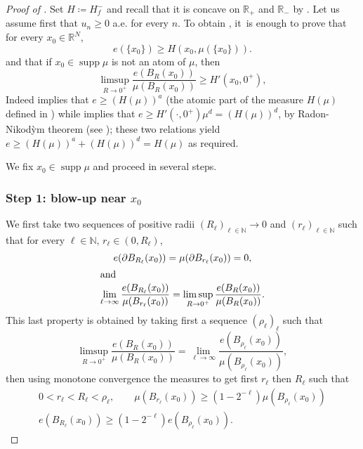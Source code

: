 \documentclass[10pt]{amsart}
\theoremstyle{plain}
\theoremstyle{definition}
\newcommand{\N}{\mathbb{N}}
\newcommand{\R}{\mathbb{R}}
\DeclareMathOperator{\supp}{supp}
\begin{document}
\begin{proof}[Proof of ]
Set $H \coloneqq H_f^-$ and recall that it is concave on $\R_+$ and $\R_-$ by . Let us assume first that $u_n \geq 0$ a.e. for every $n$. To obtain , it~is enough to prove that for every \(x_0\in\R^N\),
\begin{equation}\label{atomic}
e(\{x_0\})\ge H(x_0,\mu(\{x_0\})).
\end{equation}
and that if \(x_0 \in \supp \mu\) is not an atom of $\mu$, then
\begin{equation}\label{diffuse}
\limsup_{R\to 0^+}\frac{e(B_R(x_0))}{\mu(B_R(x_0))}\ge H'(x_0,0^+),
\end{equation}
Indeed  implies that $e \geq (H(\mu))^a$ (the atomic part of the measure \(H(\mu)\) defined in ) while  implies that $e \geq H'(\cdot,0^+) \mu^d = (H(\mu))^d$, by Radon-Nikod\`ym theorem (see \cite[Th.\,2.22]{ambrosioFunctionsBoundedVariation2000}); these two relations yield \(e\geq (H(\mu))^a+(H(\mu))^d=H(\mu)\) as required.

We fix $x_0 \in \supp \mu$ and proceed in several steps.

\subsubsection*{Step 1: blow-up near \(x_0\)} We first take two sequences of positive radii \((R_\ell)_{\ell\in\N}\to 0\) and \((r_\ell)_{\ell\in\N}\) such that for every \(\ell\in\N\), \(r_\ell\in (0,R_\ell)\),
\begin{gather}
e(\partial B_{R_\ell}(x_0))=\mu(\partial B_{r_\ell}(x_0))=0,\label{seqBoundary}\\
\shortintertext{and}
\lim_{\ell\to\infty}\frac{e(B_{R_\ell}(x_0))}{\mu(B_{r_\ell}(x_0))}
=\limsup_{R\to 0^+}\frac{e(B_R(x_0))}{\mu(B_R(x_0))}.\label{seqUpperDensity}
\end{gather}
This last property is obtained by taking first a sequence $(\rho_\ell)_\ell$ such that
\[
\limsup_{R\to 0^+}\frac{e(B_R(x_0))}{\mu(B_R(x_0))} = \lim_{\ell\to\infty} \frac{e(B_{\rho_\ell}(x_0))}{\mu(B_{\rho_\ell}(x_0))},
\]
then using monotone convergence the measures to get first \(r_\ell\) then \(R_\ell\) such that
\begin{gather*}
0 < r_\ell < R_\ell < \rho_\ell, \qquad \mu(B_{r_\ell}(x_0))\geq (1-2^{-\ell})\mu(B_{\rho_\ell}(x_0))\\
\tag*{and} e(B_{R_\ell}(x_0))\geq (1-2^{-\ell})e(B_{\rho_\ell}(x_0)).
\end{gather*}


\end{proof}
\end{document}
